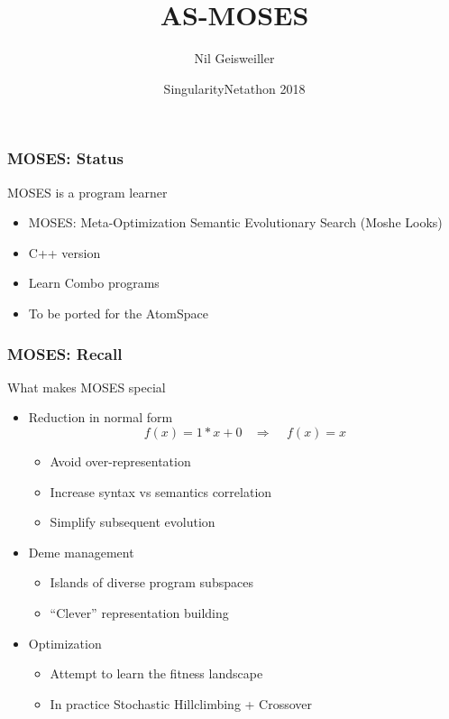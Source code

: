 \documentclass{beamer}
\title{AS-MOSES}
\author{Nil Geisweiller}
\institute[OpenCog Foundation] %
{
  OpenCog Foundation
}
\date[SingularityNetathon 2018] %
{SingularityNetathon 2018}
\begin{document}
\frame
{
  \maketitle
}


\begin{frame}[fragile]
  \frametitle{MOSES: Status}

  MOSES is a program learner
  
  \begin{itemize}
  \item MOSES: Meta-Optimization Semantic Evolutionary Search (Moshe
    Looks)
  \item C++ version
  \item Learn Combo programs
  \item To be ported for the AtomSpace
  \end{itemize}
\end{frame}

\begin{frame}[fragile]
  \frametitle{MOSES: Recall}

  What makes MOSES special
  \begin{itemize}
  \item<+-> Reduction in normal form\\
    $$f(x) = 1*x + 0\ \ \ \ \Rightarrow\ \ \ \ \ f(x) = x$$
    \begin{itemize}
    \item Avoid over-representation
    \item Increase syntax vs semantics correlation
    \item Simplify subsequent evolution
    \end{itemize}
  \item<+-> Deme management
    \begin{itemize}
    \item Islands of diverse program subspaces
    \item ``Clever'' representation building
    \end{itemize}
  \item<+-> Optimization
    \begin{itemize}
    \item Attempt to learn the fitness landscape
    \item In practice Stochastic Hillclimbing + Crossover
    \end{itemize}
  \end{itemize}

\end{frame}
\end{document}
